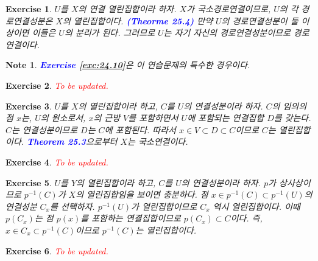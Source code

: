 \documentclass{article}
\newtheorem{exercise}{Exercise}[section]
\newtheorem*{note}{Note}
\begin{document}
\begin{exercise}
    $U$를 $X$의 연결 열린집합이라 하자. $X$가 국소경로연결이므로, $U$의 각 경로연결성분은 $X$의 열린집합이다. \textcolor{blue}{\textbf{(Theorme 25.4)}} 만약 $U$의 경로연결성분이 둘 이상이면 이들은 $U$의 분리가 된다. 그러므로 $U$는 자기 자신의 경로연결성분이므로 경로연결이다.
\end{exercise}
\begin{note}
    \textcolor{blue}{\textbf{Exercise \ref{exc:24.10}}}은 이 연습문제의 특수한 경우이다.
\end{note}

\begin{exercise}
    \textcolor{red}{To be updated.}
\end{exercise}

\begin{exercise}
    $U$를 $X$의 열린집합이라 하고, $C$를 $U$의 연결성분이라 하자. $C$의 임의의 점 $x$는, $U$의 원소로서, $x$의 근방 $V$를 포함하면서 $U$에 포함되는 연결집합 $D$를 갖는다. $C$는 연결성분이므로 $D$는 $C$에 포함된다. 따라서 $x\in V\subset D\subset C$이므로 $C$는 열린집합이다. \textcolor{blue}{\textbf{Theorem 25.3}}으로부터 $X$는 국소연결이다.
\end{exercise}

\begin{exercise}
    \textcolor{red}{To be updated.}
\end{exercise}

\begin{exercise}
    $U$를 $Y$의 열린집합이라 하고, $C$를 $U$의 연결성분이라 하자. $p$가 상사상이므로 $p^{-1}(C)$가 $X$의 열린집합임을 보이면 충분하다. 점 $x\in p^{-1}(C)\subset p^{-1}(U)$의 연결성분 $C_x$를 선택하자. $p^{-1}(U)$가 열린집합이므로 $C_x$ 역시 열린집합이다. 이때 $p(C_x)$는 점 $p(x)$를 포함하는 연결집합이므로 $p(C_x)\subset C$이다. 즉, $x\in C_x\subset p^{-1}(C)$이므로 $p^{-1}(C)$는 열린집합이다.
\end{exercise}

\begin{exercise}
    \textcolor{red}{To be updated.}
\end{exercise}
\end{document}
